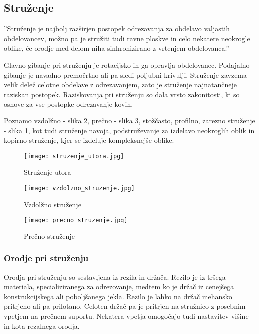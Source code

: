 \subsection{Struženje}
''Struženje je najbolj razširjen postopek odrezavanja za
obdelavo valjastih obdelovancev, možno pa je stružiti tudi ravne ploskve
in celo nekatere neokrogle oblike, če orodje med delom niha sinhronizirano
z vrtenjem obdelovanca.'' \cite{sts_arhiv_struzenje}

Glavno gibanje pri struženju je rotacijsko in ga opravlja
obdelovanec. Podajalno gibanje je navadno premočrtno ali pa
sledi poljubni krivulji. Struženje zavzema velik delež celotne
obdelave z odrezavanjem, zato je struženje najnatančneje
raziskan postopek. Raziskovanja pri struženju so dala vrsto
zakonitosti, ki so osnove za vse postopke odrezavanje kovin.

Poznamo vzdolžno - slika \ref{vzdolzno_struzenje},
prečno - slika \ref{precno_struzenje}, stožčasto, profilno,
zarezno struženje - slika \ref{struzenje_utora}, kot tudi
struženje navoja, podstruževanje za izdelavo neokroglih
oblik in kopirno struženje, kjer se izdeluje kompleksnejše oblike.

\begin{multicols}{3}
	\begin{figure}[H]
		\texttt{[image: struzenje\_utora.jpg]}
		\caption{Struženje utora
			\cite{sts_arhiv_struzenje}}
		\label{struzenje_utora}
	\end{figure}

	\columnbreak

	\begin{figure}[H]
		\texttt{[image: vzdolzno\_struzenje.jpg]}
		\caption{Vzdolžno struženje
			\cite{sts_arhiv_struzenje}}
		\label{vzdolzno_struzenje}
	\end{figure}

	\columnbreak

	\begin{figure}[H]
		\texttt{[image: precno\_struzenje.jpg]}
		\caption{Prečno struženje
			\cite{sts_arhiv_struzenje}}
		\label{precno_struzenje}
	\end{figure}
\end{multicols}

\subsubsection{Orodje pri struženju}
Orodja pri struženju so sestavljena iz rezila in držača. Rezilo je
iz tršega materiala, specializiranega za odrezovanje, medtem ko je
držač iz cenejšega konstrukcijskega ali poboljšanega jekla.
Rezilo je lahko na držač mehansko pritrjeno ali pa prilotano.
Celoten držač pa je pritrjen na stružnico z posebnim
vpetjem na prečnem suportu. Nekatera vpetja omogočajo tudi nastavitev
višine in kota rezalnega orodja.

